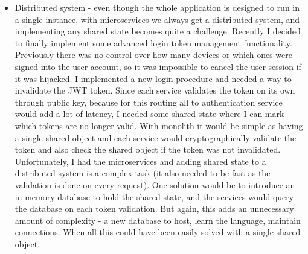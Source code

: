 \begin{itemize}
    \item Distributed system - even though the whole application is designed to run in a single instance, with microservices we always get a distributed system, and implementing any shared state becomes quite a challenge. Recently I decided to finally implement some advanced login token management functionality. Previously there was no control over how many devices or which ones were signed into the user account, so it was impossible to cancel the user session if it was hijacked. I implemented a new login procedure and needed a way to invalidate the JWT token. Since each service validates the token on its own through public key, because for this routing all to authentication service would add a lot of latency, I needed some shared state where I can mark which tokens are no longer valid. With monolith it would be simple as having a single shared object and each service would cryptographically validate the token and also check the shared object if the token was not invalidated. Unfortunately, I had the microservices and adding shared state to a distributed system is a complex task (it also needed to be fast as the validation is done on every request). One solution would be to introduce an in-memory database to hold the shared state, and the services would query the database on each token validation.  But again, this adds an unnecessary amount of complexity - a new database to host, learn the language, maintain connections. When all this could have been easily solved with a single shared object.
\end{itemize}

